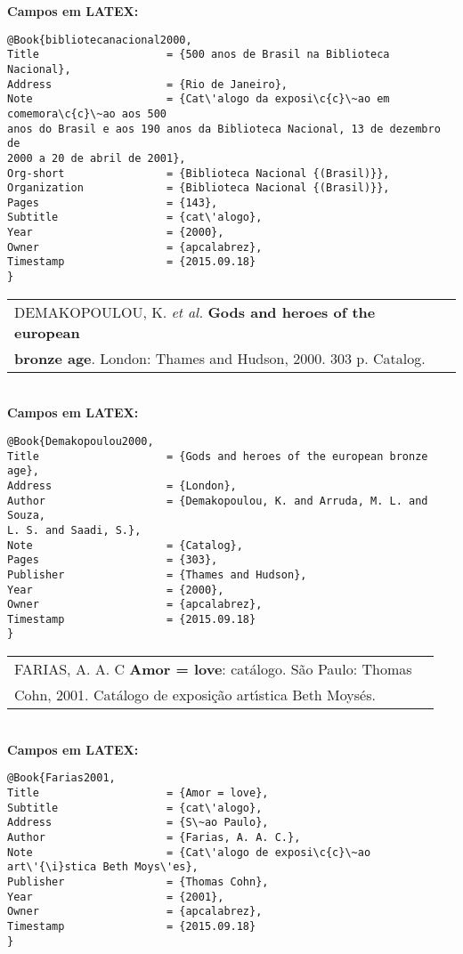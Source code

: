 \textbf{Campos em LATEX:}

\begin{verbatim}
@Book{bibliotecanacional2000,
Title                    = {500 anos de Brasil na Biblioteca Nacional},
Address                  = {Rio de Janeiro},
Note                     = {Cat\'alogo da exposi\c{c}\~ao em comemora\c{c}\~ao aos 500
anos do Brasil e aos 190 anos da Biblioteca Nacional, 13 de dezembro de
2000 a 20 de abril de 2001},
Org-short                = {Biblioteca Nacional {(Brasil)}},
Organization             = {Biblioteca Nacional {(Brasil)}},
Pages                    = {143},
Subtitle                 = {cat\'alogo},
Year                     = {2000},
Owner                    = {apcalabrez},
Timestamp                = {2015.09.18}
}
\end{verbatim}

\begin{tabular}{|l|c|} \hline
	DEMAKOPOULOU, K. \textit{et al.} \textbf{Gods and heroes of the european}\\ \textbf{bronze age}. London:  Thames and Hudson, 2000. 303 p. Catalog.    \\\hline
\end{tabular}\\

\textbf{Campos em LATEX:}

\begin{verbatim}
@Book{Demakopoulou2000,
Title                    = {Gods and heroes of the european bronze age},
Address                  = {London},
Author                   = {Demakopoulou, K. and Arruda, M. L. and Souza,
L. S. and Saadi, S.},
Note                     = {Catalog},
Pages                    = {303},
Publisher                = {Thames and Hudson},
Year                     = {2000},
Owner                    = {apcalabrez},
Timestamp                = {2015.09.18}
}
\end{verbatim}

\begin{tabular}{|l|c|} \hline
	FARIAS, A. A. C \textbf{Amor = love}: cat\'alogo. S\~ao Paulo: Thomas \\ Cohn, 2001. Cat\'alogo de exposi\c{c}\~ao art\'{\i}stica Beth Moys\'es.    \\\hline
\end{tabular}\\

\textbf{Campos em LATEX:}

\begin{verbatim}
@Book{Farias2001,
Title                    = {Amor = love},
Subtitle                 = {cat\'alogo},
Address                  = {S\~ao Paulo},
Author                   = {Farias, A. A. C.},
Note                     = {Cat\'alogo de exposi\c{c}\~ao
art\'{\i}stica Beth Moys\'es},
Publisher                = {Thomas Cohn},
Year                     = {2001},
Owner                    = {apcalabrez},
Timestamp                = {2015.09.18}
}
\end{verbatim}

